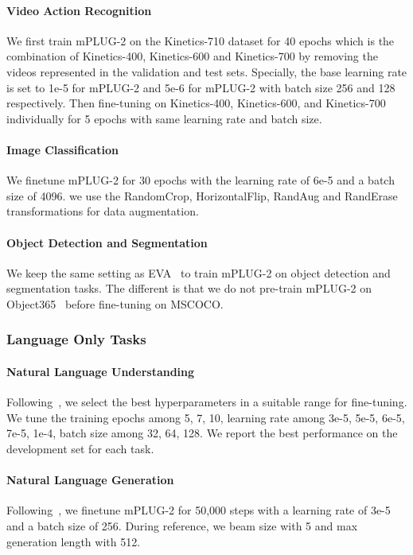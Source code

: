 \documentclass{article}
\theoremstyle{plain}
\theoremstyle{definition}
\theoremstyle{remark}
\newcommand{\modelname}{mPLUG-2 }
\newcommand{\modelnamebase}{mPLUG-2 }
\begin{document}
\paragraph{Video Action Recognition}
We first train \modelname on the Kinetics-710 dataset for 40 epochs which is the combination of Kinetics-400, Kinetics-600 and Kinetics-700 by removing the videos represented in the validation and test sets. Specially, the base learning rate is set to 1e-5 for \modelnamebase and 5e-6 for \modelname with batch size 256 and 128 respectively. Then fine-tuning on Kinetics-400, Kinetics-600, and Kinetics-700 individually for 5 epochs with same learning rate and batch size.

\paragraph{Image Classification}
We finetune \modelname for 30 epochs with the learning rate of 6e-5 and a batch size of 4096. 
we use the RandomCrop, HorizontalFlip, RandAug and RandErase transformations for data augmentation.


\paragraph{Object Detection and Segmentation}
We keep the same setting as EVA~\citep{Fang2022EVAET} to train \modelname on object detection and segmentation tasks. The different is that we do not pre-train \modelname on Object365~\citep{Shao2019Objects365AL} before fine-tuning on MSCOCO.

\subsubsection{Language Only Tasks}

\paragraph{Natural Language Understanding}
Following~\citep{Wang2022OFA}, we select the best hyperparameters in a suitable range for fine-tuning.
We tune the training epochs among {5, 7, 10}, learning rate among {3e-5, 5e-5, 6e-5, 7e-5, 1e-4}, batch size among {32, 64, 128}. We report the best performance on the development set for each task.

\paragraph{Natural Language Generation}
Following~\citep{Wang2022OFA}, we finetune \modelname for 50,000 steps with a learning rate of 3e-5 and a batch size of 256. 
During reference, we beam size with 5 and max generation length with 512.
\end{document}
